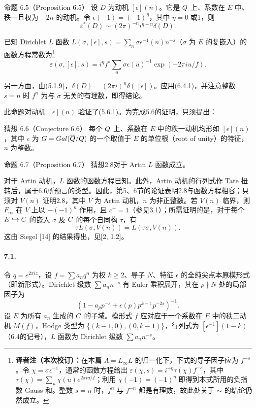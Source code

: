 \begin{originaltheorem}{命题 6.5（Proposition 6.5）}
设 $D$ 为动机 $[\epsilon](n)$。它是 $Q$ 上、系数在 $E$ 中、秩一且权为 $-2n$ 的动机。令 $\epsilon(-1)=(-1)^\eta$，其中 $\eta=0$ 或1，则
\[
 \varepsilon^*(D)\sim(2\pi)^{-n}i^{\eta-n}\delta(D).
\]
\end{originaltheorem}
已知 Dirichlet $L$ 函数
$L(\sigma,[\epsilon],s)=\sum_n\sigma\epsilon^{-1}(n)n^{-s}$（$\sigma$ 为 $E$ 的复嵌入）的函数方程常数为\footnote{\textbf{译者注（本次校订）：}在本篇 $\Lambda=L_\infty L$ 的归一化下，下式的导子因子应为 $f^{-s}$。令 $\chi=\sigma\epsilon^{-1}$，通常的函数方程给出 $\varepsilon(\chi,s)=i^{-\eta}\tau(\chi)f^{-s}$，其中 $\tau(\chi)=\sum_u\chi(u)e^{2\pi iu/f}$；利用 $\chi(-1)=(-1)^\eta$ 即得到本式所用的负指数 Gauss 和。整数 $s=n$ 时，$f^n$ 与 $f^{-n}$ 都是有理数，故此处关于 $\sim$ 的结论仍然成立。}
\[
 \varepsilon(\sigma,[\epsilon],s)
 =i^\eta f^s\sum_u\sigma\epsilon(u)^{-1}\exp(-2\pi iu/f).
\]

另一方面，由(5.1.9)，$\delta(D)=(2\pi i)^n\delta([\epsilon])$。应用(6.4.1)，并注意整数 $s=n$ 时 $f^n$ 为与 $\sigma$ 无关的有理数，即得结论。

此命题对动机 $[\epsilon](n)$ 验证了(5.6.1)。为完成5.6的证明，只须提出：
\begin{originaltheorem}{猜想 6.6（Conjecture 6.6）}
每个 $Q$ 上、系数在 $E$ 中的秩一动机均形如 $[\epsilon](n)$，其中 $\epsilon$ 为 $G=Gal(\overline{Q}/Q)$ 的一个取值于 $E$ 的单位根（root of unity）的特征，$n$ 为整数。
\end{originaltheorem}

\begin{originaltheorem}{命题 6.7（Proposition 6.7）}
猜想2.8对于 Artin $L$ 函数成立。
\end{originaltheorem}
对于 Artin 动机，$L$ 函数的函数方程已知。此外，Artin 动机的行列式作 Tate 扭转后，属于6.6所预言的类型。因此，第5、6节的论证表明2.8与函数方程相容；只须对 $V(n)$ 证明2.8，其中 $V$ 为 Artin 动机，$n$ 为非正整数。若 $V(n)$ 临界，则 $F_\infty$ 在 $V$ 上以 $-(-1)^n$ 作用，且 $c^+=1$（参见3.1）；所需证明的是，对于每个 $E\hookrightarrow C$ 的嵌入 $\sigma$ 及 $C$ 的每个自同构 $\tau$，有
\[
 \tau L(\sigma,V(n))=L(\tau\sigma,V(n)).
\]
这由 Siegel [14] 的结果得出，见[2, 1.2]。

\paragraph*{7.1.}
令 $q=e^{2\pi iz}$，设 $f=\sum a_nq^n$ 为权 $k\geq2$、导子 $N$、特征 $\epsilon$ 的全纯尖点本原模形式（即新形式）。Dirichlet 级数 $\sum a_nn^{-s}$ 有 Euler 乘积展开，其在 $p\nmid N$ 处的局部因子为
\[
 (1-a_pp^{-s}+\epsilon(p)p^{k-1}p^{-2s})^{-1}.
\]
设 $E$ 为所有 $a_n$ 生成的 $C$ 的子域。模形式 $f$ 应对应于一个系数在 $E$ 中的秩二动机 $M(f)$，Hodge 类型为 $\{(k-1,0),(0,k-1)\}$，行列式为 $[\epsilon^{-1}](1-k)$（6.4的记号），$L$ 函数为 Dirichlet 级数 $\sum a_nn^{-s}$。

